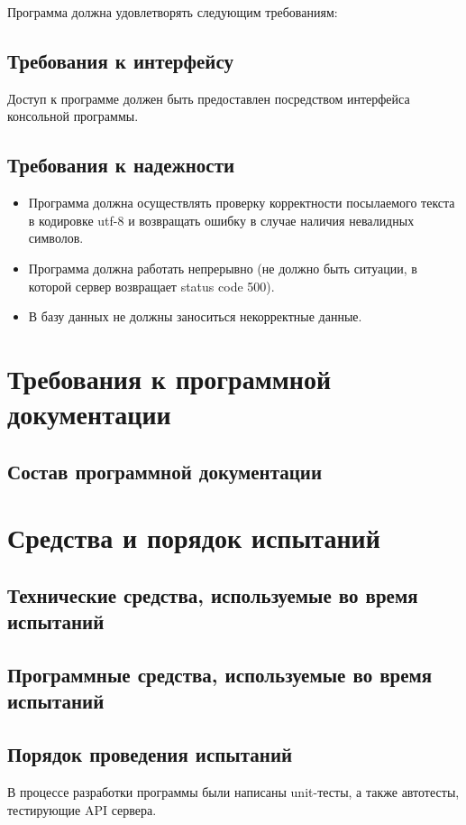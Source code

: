 \documentclass[a4paper,12pt]{article}
\begin{document}
	Программа должна удовлетворять следующим требованиям:
	
	
	
	\subsection{Требования к интерфейсу}
	Доступ к программе должен быть предоставлен посредством интерфейса консольной программы.
	\subsection{Требования к надежности}
	\begin{itemize}
	    \item Программа должна осуществлять проверку корректности посылаемого текста в кодировке utf-8 и возвращать ошибку в случае наличия невалидных символов.
        \item Программа должна работать непрерывно (не должно быть ситуации, в которой сервер возвращает status code 500).
        \item В базу данных не должны заноситься некорректные данные.
	\end{itemize}
						\newpage
	\section{Требования к программной документации}
	\subsection{Состав программной документации}
	
						\newpage
	\section{Средства и порядок испытаний}
	\subsection{Технические средства, используемые во время испытаний}
	
	\subsection{Программные средства, используемые во время испытаний}
	
	\subsection{Порядок проведения испытаний}
	В процессе разработки программы были написаны unit-тесты, а также автотесты, тестирующие API сервера.
	
\end{document}

